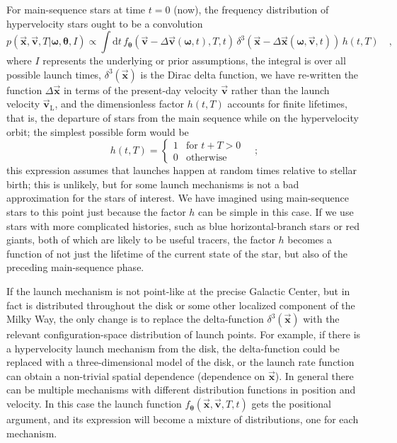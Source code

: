 \documentclass[12pt]{article}
\newcommand{\tvector}[1]{\boldsymbol{\vec{#1}}}
\newcommand{\vx}{\tvector{x}}
\newcommand{\vv}{\tvector{v}}
\newcommand{\vvlaunch}{{\vv_{\mathrm{L}}}} %
\newcommand{\pvector}[1]{\boldsymbol{#1}}
\newcommand{\vtheta}{\pvector{\theta}}
\newcommand{\vomega}{\pvector{\omega}}
\newcommand{\dd}{\mathrm{d}}
\newcommand{\flaunch}{f_{\vtheta}}
\begin{document}
For main-sequence stars at time $t=0$ (now), the frequency
distribution of hypervelocity stars ought to be a convolution
\begin{equation}\label{eq:pvxT}
p(\vx,\vv,T|\vomega,\vtheta,I) \propto \int \dd t
 \,\flaunch\left(\vv-\Delta\vv(\vomega,t),T,t\right)
 \,\delta^3\left(\vx-\Delta\vx(\vomega,\vv,t)\right)\,h(t,T) \quad,
\end{equation}
where $I$ represents the underlying or prior assumptions, the integral
is over all possible launch times, $\delta^3(\vx)$ is the Dirac delta
function, we have re-written the function $\Delta\vx$ in terms of the
present-day velocity $\vv$ rather than the launch velocity
$\vvlaunch$, and the dimensionless factor $h(t,T)$ accounts for finite
lifetimes, that is, the departure of stars from the main sequence
while on the hypervelocity orbit; the simplest possible form would be
\begin{equation}
h(t,T) = \left\{\begin{array}{cl}\displaystyle
1&\mbox{for $t+T>0$}\\
0&\mbox{otherwise}
\end{array}\right.\quad ;
\end{equation}
this expression assumes that launches happen at random times relative
to stellar birth; this is unlikely, but for some launch mechanisms is
not a bad approximation for the stars of interest.  We have imagined
using main-sequence stars to this point just because the factor $h$
can be simple in this case.  If we use stars with more complicated
histories, such as blue horizontal-branch stars or red giants, both of
which are likely to be useful tracers, the factor $h$ becomes a
function of not just the lifetime of the current state of the star,
but also of the preceding main-sequence phase.

If the launch mechanism is not point-like at the precise Galactic
Center, but in fact is distributed throughout the disk or some other
localized component of the Milky Way, the only change is to replace
the delta-function $\delta^3(\vx)$ with the relevant
configuration-space distribution of launch points.  For example, if
there is a hypervelocity launch mechanism from the disk, the
delta-function could be replaced with a three-dimensional model of the
disk, or the launch rate function can obtain a non-trivial spatial
dependence (dependence on $\vx$).  In general there can be multiple
mechanisms with different distribution functions in position and
velocity.  In this case the launch function $\flaunch(\vx,\vv,T,t)$
gets the positional argument, and its expression will become a mixture
of distributions, one for each mechanism.
\end{document}
